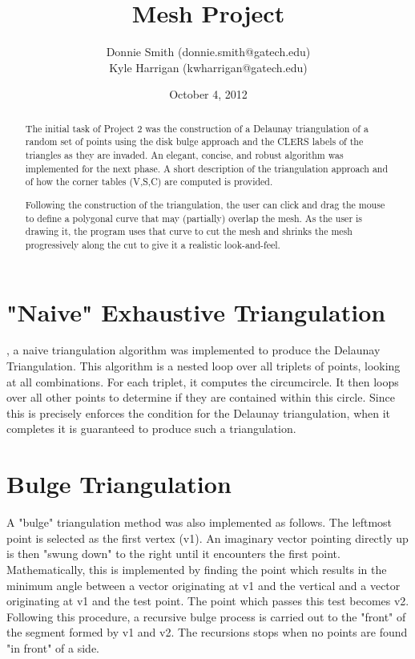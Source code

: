 \documentclass[letterpaper,10pt]{IEEEtran}
\title{Mesh Project}
\author{
Donnie Smith (donnie.smith@gatech.edu) \\
Kyle Harrigan (kwharrigan@gatech.edu) 
}
\date{October 4, 2012}                                           %
\begin{document}


\maketitle

 \begin{abstract}
 
The initial task of Project 2 was the construction of a Delaunay triangulation \cite{wiki:delaunay} of a random set of points using the disk bulge approach and the CLERS \cite{Rossignac99wrapzip,Rossignac04compressingvolumes} labels of the triangles as they are invaded.  An elegant, concise, and robust algorithm was implemented for the next phase. A short description of the triangulation approach and of how the corner tables (V,S,C) \cite{Rossignac04compressingvolumes} are computed is provided.

Following the construction of the triangulation, the user can click and drag the mouse to define a polygonal curve that may (partially) overlap the mesh.  As the user is drawing it, the program uses that curve to cut the mesh and shrinks the mesh progressively along the cut to give it a realistic look-and-feel.
 
 \end{abstract}
 
\section{"Naive" Exhaustive Triangulation}
 , a naive triangulation algorithm was implemented to produce the Delaunay Triangulation.  This algorithm is a nested loop over all triplets of points, looking at all combinations.  For each triplet, it computes the circumcircle.  It then loops over all other points to determine if they are contained within this circle.  Since this is precisely enforces the condition for the Delaunay triangulation, when it completes it is guaranteed to produce such a triangulation.  

\section{Bulge Triangulation}
A "bulge" triangulation method was also implemented as follows.  The leftmost point is selected as the first vertex (v1).  An imaginary vector pointing directly up is then "swung down" to the right until it encounters the first point.  Mathematically, this is implemented by finding the point which results in the minimum angle between a vector originating at v1 and the vertical and a vector originating at v1 and the test point.  The point which passes this test becomes v2.  
Following this procedure, a recursive bulge process is carried out to the "front" of the segment formed by v1 and v2.    The recursions stops when no points are found "in front" of a side.   
\end{document}
